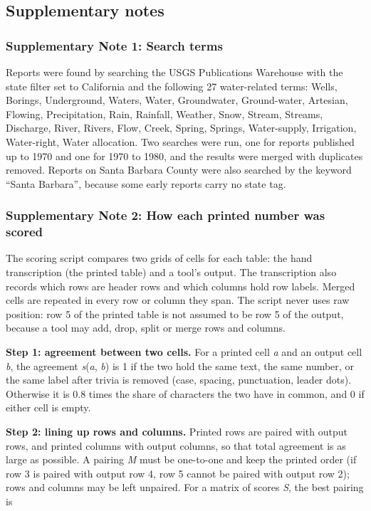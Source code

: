 \subsection*{Supplementary notes}

\subsubsection*{Supplementary Note 1: Search terms}

Reports were found by searching the USGS Publications Warehouse with the state filter set to California and the following 27 water-related terms: Wells, Borings, Underground, Waters, Water, Groundwater, Ground-water, Artesian, Flowing, Precipitation, Rain, Rainfall, Weather, Snow, Stream, Streams, Discharge, River, Rivers, Flow, Creek, Spring, Springs, Water-supply, Irrigation, Water-right, Water allocation. Two searches were run, one for reports published up to 1970 and one for 1970 to 1980, and the results were merged with duplicates removed. Reports on Santa Barbara County were also searched by the keyword ``Santa Barbara'', because some early reports carry no state tag.

\subsubsection*{Supplementary Note 2: How each printed number was scored}

The scoring script compares two grids of cells for each table: the hand transcription (the printed table) and a tool's output. The transcription also records which rows are header rows and which columns hold row labels. Merged cells are repeated in every row or column they span. The script never uses raw position: row 5 of the printed table is not assumed to be row 5 of the output, because a tool may add, drop, split or merge rows and columns.

\textbf{Step 1: agreement between two cells.} For a printed cell \textit{a} and an output cell \textit{b}, the agreement \textit{s}(\textit{a}, \textit{b}) is 1 if the two hold the same text, the same number, or the same label after trivia is removed (case, spacing, punctuation, leader dots). Otherwise it is 0.8 times the share of characters the two have in common, and 0 if either cell is empty.

\textbf{Step 2: lining up rows and columns.} Printed rows are paired with output rows, and printed columns with output columns, so that total agreement is as large as possible. A pairing \textit{M} must be one-to-one and keep the printed order (if row 3 is paired with output row 4, row 5 cannot be paired with output row 2); rows and columns may be left unpaired. For a matrix of scores \textit{S}, the best pairing is

